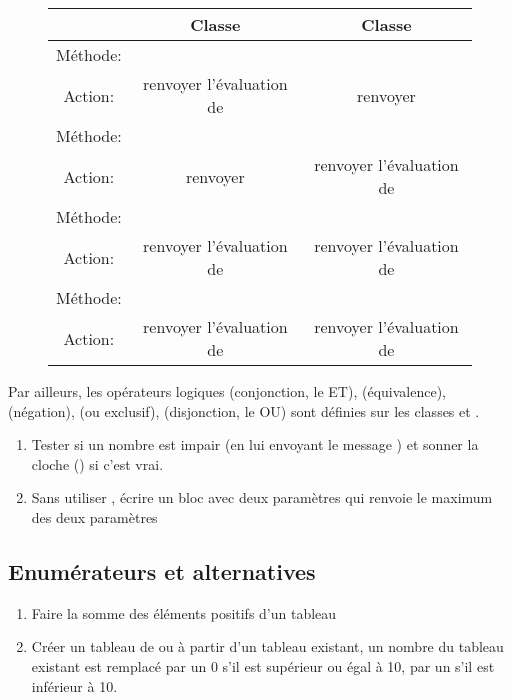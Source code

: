 \begin{figure}[htp]
\small
\begin{center}
\begin{tabular}{|c|c|c|}
\hline
& Classe \ct{True} & Classe \ct{False}\\
\hline
M\'ethode: & \ct{ifTrue: unBloc} &  \ct{ifTrue: unBloc}\\
Action: & renvoyer l'\'evaluation de \ct{unBloc} & renvoyer \ct{nil}\\
\hline
M\'ethode: & \ct{ifFalse: unBloc} & \ct{ifFalse: unBloc}\\
Action: & renvoyer \ct{nil} & renvoyer l'\'evaluation de \ct{unBloc}\\
\hline
M\'ethode: & \ct{ifTrue: unBloc ifFalse: unAutreBloc} & \ct{ifTrue: unBloc ifFalse: unAutreBloc}\\
Action: & renvoyer l'\'evaluation de \ct{unBloc} & renvoyer l'\'evaluation de 
\ct{unAutreBloc}\\
\hline
M\'ethode: & \ct{ifFalse: unBloc ifTrue: unAutreBloc} & \ct{ifFalse: unBloc ifTrue: unAutreBloc}\\
Action: & renvoyer l'\'evaluation de \ct{unAutreBloc} & renvoyer l'\'evaluation de \ct{unBloc}\\
\hline
\end{tabular}
\end{center}
\end{figure}
Par ailleurs, les op\'erateurs logiques \ct{\&} (conjonction, le ET),
 (\'equivalence),  (n\'egation),  (ou exclusif),
\ct{\stBar} (disjonction, le OU) sont d\'efinies sur les classes 
et .

\begin{enumerate}
\item
Tester si un nombre est impair (en lui envoyant le message ) et
sonner la cloche () si c'est vrai.
\item
Sans utiliser , \'ecrire un bloc avec deux param\`etres qui renvoie
le maximum des deux param\`etres
\end{enumerate}

\subsection{Enum\'erateurs et alternatives}
\begin{enumerate}
\item
Faire la somme des \'el\'ements positifs d'un tableau
\item
Cr\'eer un tableau de  ou  \`a partir d'un tableau existant, un nombre  du tableau existant est remplac\'e par un 0 s'il est sup\'erieur
ou \'egal \`a 10, par un  s'il est inf\'erieur \`a 10.
\end{enumerate}

